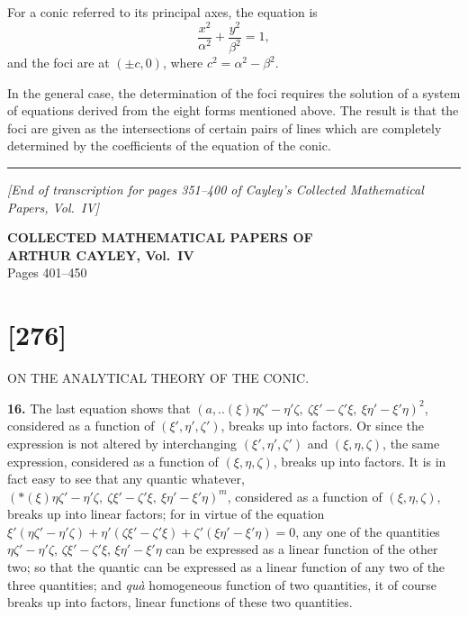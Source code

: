 \documentclass[11pt,a4paper]{book}
\providecommand{\qform}[1]{(#1)}
\begin{document}
For a conic referred to its principal axes, the equation is
\[\frac{x^{2}}{\alpha^{2}} + \frac{y^{2}}{\beta^{2}} = 1,\]
and the foci are at $(\pm c, 0)$, where $c^{2} = \alpha^{2} - \beta^{2}$.

In the general case, the determination of the foci requires the solution of a system of
equations derived from the eight forms mentioned above. The result is that the foci are
given as the intersections of certain pairs of lines which are completely determined by
the coefficients of the equation of the conic.

\vspace{2em}
\noindent\rule{\textwidth}{0.4pt}
\vspace{0.5em}

\noindent\textit{[End of transcription for pages 351--400 of Cayley's Collected Mathematical Papers, Vol.~IV]}
\clearpage


\begin{center}
{\Large\bfseries COLLECTED MATHEMATICAL PAPERS OF\\[0.5em] ARTHUR CAYLEY, Vol.~IV}\\[1em]
{\large Pages 401--450}
\end{center}
\thispagestyle{empty}

\newpage

\newpage
\section*{[276]}
\begin{center}
{\large ON THE ANALYTICAL THEORY OF THE CONIC.}
\end{center}

\textbf{16.} The last equation shows that $(a,..\!\qform{\xi}{\eta\zeta' - \eta'\zeta,\ \zeta\xi' - \zeta'\xi,\ \xi\eta' - \xi'\eta})^{2}$, considered as a function of $(\xi', \eta', \zeta')$, breaks up into factors. Or since the expression is not altered by interchanging $(\xi', \eta', \zeta')$ and $(\xi, \eta, \zeta)$, the same expression, considered as a function of $(\xi, \eta, \zeta)$, breaks up into factors. It is in fact easy to see that any quantic whatever, $(*\!\qform{\xi}{\eta\zeta' - \eta'\zeta,\ \zeta\xi' - \zeta'\xi,\ \xi\eta' - \xi'\eta})^{m}$, considered as a function of $(\xi, \eta, \zeta)$, breaks up into linear factors; for in virtue of the equation $\xi'(\eta\zeta' - \eta'\zeta) + \eta'(\zeta\xi' - \zeta'\xi) + \zeta'(\xi\eta' - \xi'\eta) = 0$, any one of the quantities $\eta\zeta' - \eta'\zeta$, $\zeta\xi' - \zeta'\xi$, $\xi\eta' - \xi'\eta$ can be expressed as a linear function of the other two; so that the quantic can be expressed as a linear function of any two of the three quantities; and \textit{qu\`a} homogeneous function of two quantities, it of course breaks up into factors, linear functions of these two quantities.
\end{document}
